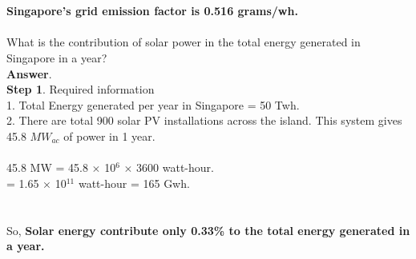 \documentclass[11pt]{exam}
\begin{document}
\begin{questions}
{\begin{minipage}{42em}
\end{minipage}} \\ \\
                 \textbf{Singapore's grid emission factor is 0.516 grams/wh.} \\ \\ 



\question
\label{Q25:Solar power}
What is the contribution of solar power in the total energy generated in Singapore in a year? \\
\textbf{Answer}. \\
\textbf{Step 1}. Required information \\
                 1. Total Energy generated per year in Singapore = 50 Twh.\\
                    
                 2. There are total 900 solar PV installations across the island. This system gives 45.8 $MW_{ac}$ of power in 1 year.\\\\
                     45.8 MW = 45.8 $\times$ 10$^{6}$ $\times$ 3600 watt-hour.\\ 
                             = 1.65 $\times$ 10$^{11}$ watt-hour = 165 Gwh.\\ 
                    
 \\ \\
                   So, \textbf{Solar energy contribute only 0.33\% to the total energy generated in a year.}\\                    
                 

\end{questions}
\end{document}

